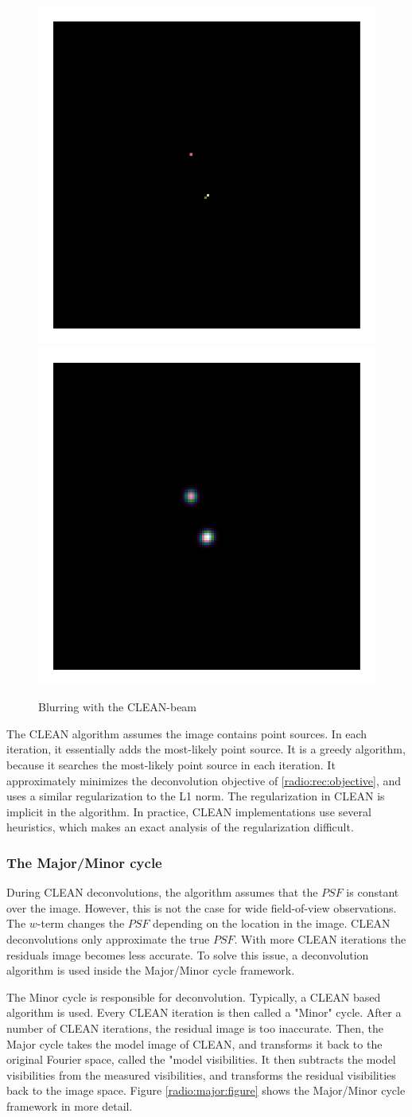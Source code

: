 \begin{figure}[h]
	\centering
	\includegraphics[width=0.25\linewidth, clip, trim= 1.0in 1.0in 1.0in 1.0in]{./chapters/01.intro/cleanExample/model_CLEAN_3.png}
	\includegraphics[width=0.25\linewidth, clip, trim= 1.0in 1.0in 1.0in 1.0in]{./chapters/01.intro/cleanExample/rec_CLEAN.png}
	\caption{Blurring with the CLEAN-beam}
	\label{radio:clean:beam}
\end{figure}

The CLEAN algorithm assumes the image contains point sources. In each iteration, it essentially adds the most-likely point source. It is a greedy algorithm, because it searches the most-likely point source in each iteration. It approximately minimizes the deconvolution objective of \eqref{radio:rec:objective}, and uses a similar regularization to the L1 norm. The regularization in CLEAN is implicit in the algorithm. In practice, CLEAN implementations use several heuristics, which makes an exact analysis of the regularization difficult.

\subsubsection{The Major/Minor cycle}\label{intro2:opt:cycle}
During CLEAN deconvolutions, the algorithm assumes that the $PSF$ is constant over the image. However, this is not the case for wide field-of-view observations. The $w$-term changes the $PSF$ depending on the location in the image. CLEAN deconvolutions only approximate the true $PSF$. With more CLEAN iterations the residuals image becomes less accurate. To solve this issue, a deconvolution algorithm is used inside the Major/Minor cycle framework. 

The Minor cycle is responsible for deconvolution. Typically, a CLEAN based algorithm is used. Every CLEAN iteration is then called a "Minor" cycle. After a number of CLEAN iterations, the residual image is too inaccurate. Then, the Major cycle takes the model image of CLEAN, and transforms it back to the original Fourier space, called the "model visibilities. It then subtracts the model visibilities from the measured visibilities, and transforms the residual visibilities back to the image space. Figure \ref{radio:major:figure} shows the Major/Minor cycle framework in more detail.

